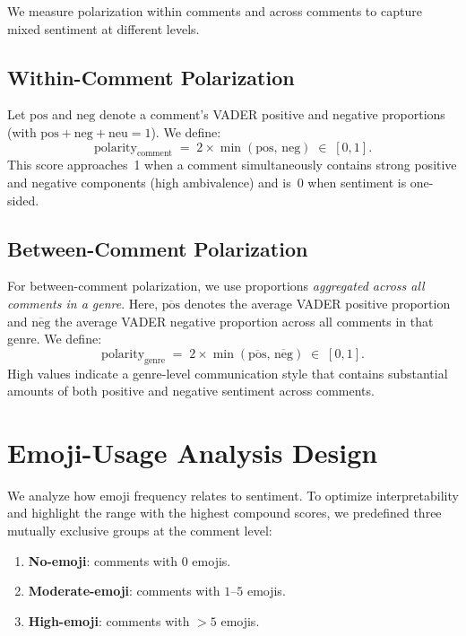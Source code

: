 We measure polarization within comments and across comments to capture mixed sentiment at different levels.

\subsection{Within-Comment Polarization}
\label{subsubsec:within}

Let $\mathrm{pos}$ and $\mathrm{neg}$ denote a comment's VADER positive and negative proportions
(with $\mathrm{pos}+\mathrm{neg}+\mathrm{neu}=1$). We define:
\begin{equation}
\label{eq:polarity_comment}
\mathrm{polarity}_{\mathrm{comment}} \;=\; 2 \times \min(\mathrm{pos},\, \mathrm{neg}) \;\in\; [0,1].
\end{equation}
This score approaches~1 when a comment simultaneously contains strong positive and negative
components (high ambivalence) and is~0 when sentiment is one-sided.

\subsection{Between-Comment Polarization}
\label{subsubsec:between}

For between-comment polarization, we use proportions \emph{aggregated across all comments in a genre}. 
Here, $\overline{\mathrm{pos}}$ denotes the average VADER positive proportion and 
$\overline{\mathrm{neg}}$ the average VADER negative proportion across all comments in that genre. 
We define:
\begin{equation}
\label{eq:polarity_genre}
\mathrm{polarity}_{\mathrm{genre}} \;=\; 2 \times \min(\overline{\mathrm{pos}},\, \overline{\mathrm{neg}}) \;\in\; [0,1].
\end{equation}
High values indicate a genre-level communication style that contains substantial amounts of both 
positive and negative sentiment across comments.

\section{Emoji-Usage Analysis Design}
\label{subsec:emoji_design}
We analyze how emoji frequency relates to sentiment. To optimize interpretability and highlight the range with the highest compound scores, we predefined three mutually exclusive groups at the comment level:
\begin{enumerate}
    \item \textbf{No-emoji}: comments with $0$ emojis.
    \item \textbf{Moderate-emoji}: comments with $1$--$5$ emojis.
    \item \textbf{High-emoji}: comments with $>5$ emojis.
\end{enumerate}


